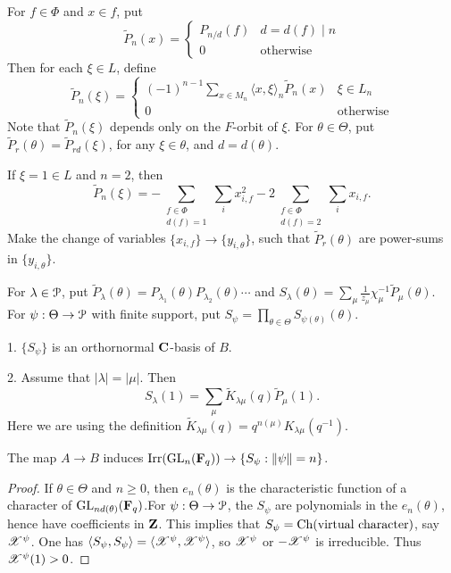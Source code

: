 \documentclass{article}
\begin{document}
For $f\in \Phi$ and $x\in f$, put 
\[
  \widetilde P_n(x) = \begin{cases} P_{n/d}(f) & d=d(f)\mid n \\ 0 & \text{otherwise} \end{cases}
\]
Then for each $\xi\in L$, define 
\[
  \widetilde P_n(\xi) = 
  \begin{cases}
    (-1)^{n-1} \sum_{x\in M_n} \langle x,\xi\rangle_n \widetilde P_n(x) & \xi\in L_n \\ 0 & \text{otherwise} 
  \end{cases}
\]
Note that $\widetilde P_n(\xi)$ depends only on the $F$-orbit of $\xi$. For 
$\theta\in \Theta$, put $\widetilde P_r(\theta) = \widetilde P_{rd}(\xi)$, for 
any $\xi\in \theta$, and $d=d(\theta)$. 

\begin{example}
If $\xi=1\in L$ and $n=2$, then 
\[
  \widetilde P_n(\xi) = - \sum_{\substack{f\in \Phi \\ d(f)=1}} \sum_i x_{i,f}^2 - 2 \sum_{\substack{f\in \Phi \\ d(f) = 2}} \sum_i x_{i,f} .
\]
Make the change of variables $\{x_{i,f}\} \to \{y_{i,\theta}\}$, such that 
$\widetilde P_r(\theta)$ are power-sums in $\{y_{i,\theta}\}$. 
\end{example}

For $\lambda\in \mathcal{P}$, put 
$\widetilde P_\lambda(\theta) = P_{\lambda_1}(\theta) P_{\lambda_2}(\theta) \dotsm$ and 
$S_\lambda(\theta) = \sum_\mu \frac{1}{z_\mu} \chi_\mu^{-1} \widetilde P_\mu(\theta)$. 
For $\psi:\Theta \to \mathcal{P}$ with finite support, put 
$S_\psi = \prod_{\theta\in \Theta} S_{\psi(\theta)}(\theta)$. 

\begin{proposition}
1. $\{S_\psi\}$ is an orthornormal $\mathbf{C}$-basis of $B$. 

2. Assume that $|\lambda|=|\mu|$. Then 
\[
  S_\lambda(1) = \sum_\mu \widetilde K_{\lambda\mu}(q) \widetilde P_\mu(1) .
\]
Here we are using the definition 
$\widetilde K_{\lambda\mu}(q) = q^{n(\mu)} K_{\lambda\mu}(q^{-1})$. 
\end{proposition}


\begin{theorem}
The map $A\to B$ induces 
$\operatorname{Irr}(\operatorname{GL}_n(\mathbf{F}_q)) \to\{S_\psi:\|\psi\| = n\}$. 
\end{theorem}
\begin{proof}
If $\theta\in \Theta$ and $n\geqslant 0$, then $e_n(\theta)$ is the characteristic 
function of a character of $\operatorname{GL}_{nd(\theta)}(\mathbf{F}_q)$.For 
$\psi:\Theta\to \mathcal{P}$, the $S_\psi$ are polynomials in the $e_n(\theta)$, hence 
have coefficients in $\mathbf{Z}$. This implies that 
$S_\psi=\operatorname{Ch}(\text{virtual character})$, say $\mathscr{X}^\psi$. One has 
$\langle S_\psi,S_\psi\rangle = \langle \mathscr{X}^\psi,\mathscr{X}^\psi\rangle$, so 
$\mathscr{X}^\psi$ or $-\mathscr{X}^\psi$ is irreducible. Thus $\mathscr{X}^\psi(1)>0$. 
\end{proof}
\end{document}
